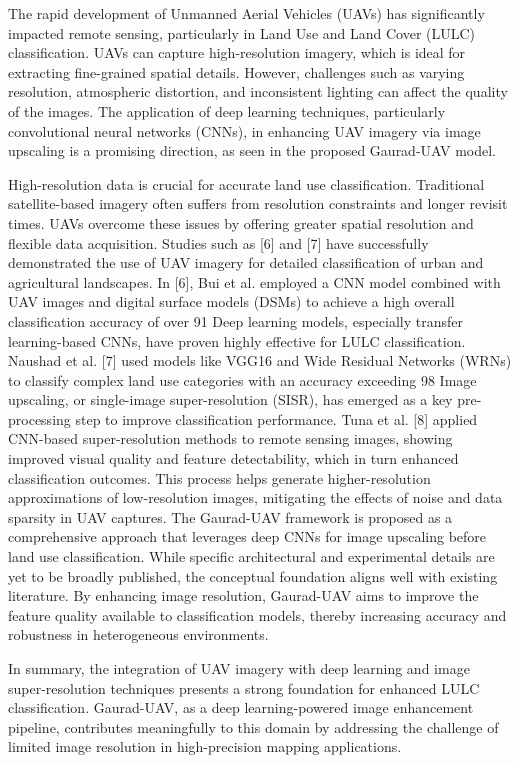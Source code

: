 The rapid development of Unmanned Aerial Vehicles (UAVs) has significantly impacted remote sensing, particularly in Land Use and Land Cover (LULC) classification. UAVs can capture high-resolution imagery, which is ideal for extracting fine-grained spatial details. However, challenges such as varying resolution, atmospheric distortion, and inconsistent lighting can affect the quality of the images. The application of deep learning techniques, particularly convolutional neural networks (CNNs), in enhancing UAV imagery via image upscaling is a promising direction, as seen in the proposed Gaurad-UAV model.

High-resolution data is crucial for accurate land use classification. Traditional satellite-based imagery often suffers from resolution constraints and longer revisit times. UAVs overcome these issues by offering greater spatial resolution and flexible data acquisition. Studies such as [6] and [7] have successfully demonstrated the use of UAV imagery for detailed classification of urban and agricultural landscapes. In [6], Bui et al. employed a CNN model combined with UAV images and digital surface models (DSMs) to achieve a high overall classification accuracy of over 91%
Deep learning models, especially transfer learning-based CNNs, have proven highly effective for LULC classification. Naushad et al. [7] used models like VGG16 and Wide Residual Networks (WRNs) to classify complex land use categories with an accuracy exceeding 98%
Image upscaling, or single-image super-resolution (SISR), has emerged as a key pre-processing step to improve classification performance. Tuna et al. [8] applied CNN-based super-resolution methods to remote sensing images, showing improved visual quality and feature detectability, which in turn enhanced classification outcomes. This process helps generate higher-resolution approximations of low-resolution images, mitigating the effects of noise and data sparsity in UAV captures.
The Gaurad-UAV framework is proposed as a comprehensive approach that leverages deep CNNs for image upscaling before land use classification. While specific architectural and experimental details are yet to be broadly published, the conceptual foundation aligns well with existing literature. By enhancing image resolution, Gaurad-UAV aims to improve the feature quality available to classification models, thereby increasing accuracy and robustness in heterogeneous environments.

In summary, the integration of UAV imagery with deep learning and image super-resolution techniques presents a strong foundation for enhanced LULC classification. Gaurad-UAV, as a deep learning-powered image enhancement pipeline, contributes meaningfully to this domain by addressing the challenge of limited image resolution in high-precision mapping applications.